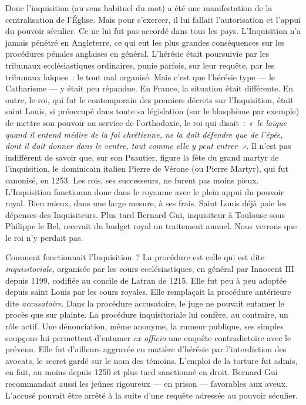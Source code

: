 \documentclass[french,twoside]{book} %
\begin{document}
Donc l’inquisition (au sens habituel du mot) a été une manifestation de la centralisation de l’Église. Mais pour s’exercer, il lui fallait l’autorisation et l’appui du pouvoir séculier. Ce ne lui fut pas accordé dans tous les pays. L’Inquisition n’a jamais pénétré en Angleterre, ce qui eut les plus grandes conséquences sur les procédures pénales anglaises en général. L’hérésie était poursuivie par les tribunaux ecclésiastiques ordinaires, punie parfois, sur leur requête, par les tribunaux laïques : le tout mal organisé. Mais c’est que l’hérésie type — le Catharisme — y était peu répandue. En France, la situation était différente. En outre, le roi, qui fut le contemporain des premiers décrets sur l’Inquisition, était saint Louis, si préoccupé dans toute sa législation (sur le blasphème par exemple) de mettre son pouvoir au service de l’orthodoxie, le roi qui disait : \emph{« le laïque quand il entend médire de la foi chrétienne, ne la doit défendre que de l’épée, dont il doit donner dans le ventre, tout comme elle y peut entrer »}. Il n’est pas indifférent de savoir que, sur son Psautier, figure la fête du grand martyr de l’inquisition, le dominicain italien Pierre de Vérone (ou Pierre Martyr), qui fut canonisé, en 1253. Les rois, ses successeurs, ne furent pas moins pieux. L’Inquisition fonctionna donc dans le royaume avec le plein appui du pouvoir royal. Bien mieux, dans une large mesure, à ses frais. Saint Louis déjà paie les dépenses des Inquisiteurs. Plus tard Bernard Gui, inquisiteur à Toulouse sous Philippe le Bel, recevait du budget royal un traitement annuel. Nous verrons que le roi n’y perdait pas.\par
Comment fonctionnait l’Inquisition ? La procédure est celle qui est dite \emph{inquisitoriale}, organisée par les cours ecclésiastiques, en général par Innocent III depuis 1199, codifiée au concile de Latran de 1215. Elle fut peu à peu adoptée depuis saint Louis par les cours royales. Elle remplaçait la procédure antérieure dite \emph{accusatoire}. Dans la procédure accusatoire, le juge ne pouvait entamer le procès que sur plainte. La procédure inquisitoriale lui confère, au contraire, un rôle actif. Une dénonciation, même anonyme, la rumeur publique, ses simples soupçons lui permettent d’entamer \emph{ex officio} une enquête contradictoire avec le prévenu. Elle fut d’ailleurs aggravée en matière d’hérésie par l’interdiction des avocats, le secret gardé sur le nom des témoins. L’emploi de la torture fut admis, en fait, au moins depuis 1250 et plus tard sanctionné en droit. Bernard Gui recommandait aussi les jeûnes rigoureux — en prison — favorables aux aveux. L’accusé pouvait être arrêté à la suite d’une requête adressée au pouvoir séculier.\par
\end{document}
